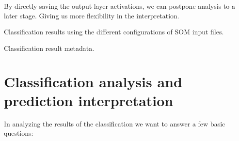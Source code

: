 \documentclass[11pt,a4paper]{article}
\begin{document}
By directly saving the output layer activations, we can postpone analysis to a later stage. Giving us more flexibility in the interpretation.

\begin{table}[h]
   \centering
   
   \caption{Classification results using the different configurations of SOM input files.}
\end{table}

\begin{landscape}
\begin{table}
   \resizebox{\linewidth}{!}{%
   
   }
   \caption{Classification result metadata.}
\end{table}
\end{landscape}

\section{Classification analysis and prediction interpretation}

In analyzing the results of the classification we want to answer a few basic questions:
\end{document}
